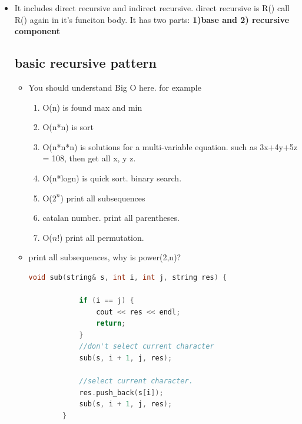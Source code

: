\documentclass[a4paper,11pt,twoside]{book}
\begin{document}
\begin{itemize}
\begin{enumerate}
\end{enumerate}

	\item It includes direct recursive and indirect recursive. direct recursive is R() call R() again in it's funciton body. It has two parts: \textbf{1)base and 2) recursive component}
	
\subsection{basic recursive pattern}
\begin{itemize}
	\item You should understand Big O here. for example 
	\begin{enumerate}
		\item O(n) is found max and min
		\item O(n*n) is sort
		\item O(n*n*n) is  solutions for a multi-variable equation. such as 3x+4y+5z = 108, then get all x, y z.
		\item O(n*logn) is quick sort. binary search. 
		\item O($2^{n}$) print all subsequences
		\item catalan number. print all parentheses.
		\item O($n!$) print all permutation.
		
	\end{enumerate}
		
	\item print all subsequences, why is power(2,n)?
	\begin{lstlisting}[frame=single, language=c++]
		void sub(string& s, int i, int j, string res) {
			
			if (i == j) {
				cout << res << endl;
				return;
			}
			//don't select current character
			sub(s, i + 1, j, res);
			
			//select current character.
			res.push_back(s[i]);
			sub(s, i + 1, j, res);
		}
	\end{lstlisting}
	

\end{itemize}
\end{itemize}
\end{document}
